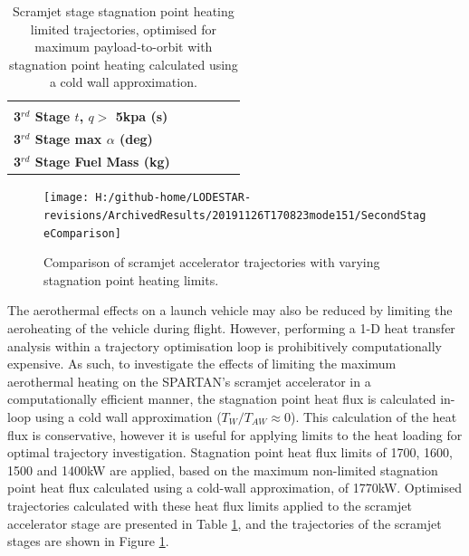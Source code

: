 \begin{table}[ht]
\begin{tabular}{l c c c c c }
		& \textbf{\thirddExergyEffheatLimStandard}
		& \textbf{\thirddExergyEffheatLimSeventeenHundred}
		& \textbf{\thirddExergyEffheatLimSixteenHundred}
		& \textbf{\thirddExergyEffheatLimFifteenHundred}
		& \textbf{\thirddExergyEffheatLimFourteenHundred}
		\\
		\textbf{3$^{rd}$ Stage $t$, $q >$ 5kpa (s)}
		& \thirdqOverFiveheatLimStandard
		& \thirdqOverFiveheatLimSeventeenHundred
		& \thirdqOverFiveheatLimSixteenHundred
		& \thirdqOverFiveheatLimFifteenHundred
		& \thirdqOverFiveheatLimFourteenHundred
		\\
		\textbf{3$^{rd}$ Stage max $\alpha$ (deg)}
		& \thirdmaxAoAheatLimStandard
		& \thirdmaxAoAheatLimSeventeenHundred
		& \thirdmaxAoAheatLimSixteenHundred
		& \thirdmaxAoAheatLimFifteenHundred
		& \thirdmaxAoAheatLimFourteenHundred
		\\
		\textbf{3$^{rd}$ Stage Fuel Mass (kg)}
		& \thirdmFuelheatLimStandard
		& \thirdmFuelheatLimSeventeenHundred
		& \thirdmFuelheatLimSixteenHundred
		& \thirdmFuelheatLimFifteenHundred
		& \thirdmFuelheatLimFourteenHundred
		\\
		\hline 
	\end{tabular} 
	\caption{Scramjet stage stagnation point heating limited trajectories, optimised for maximum payload-to-orbit with stagnation point heating calculated using a cold wall approximation. }
	\label{tab:stagLim}
\end{table}

\begin{figure}[!ht]
\centering
\texttt{[image: H:/github-home/LODESTAR-revisions/ArchivedResults/20191126T170823mode151/SecondStageComparison]}
\caption{Comparison of scramjet accelerator trajectories with varying stagnation point heating limits.}
\label{fig:SecondStageheatlimComparison}
\end{figure}


The aerothermal effects on a launch vehicle may also be reduced by limiting the aeroheating of the vehicle during flight. However, performing a 1-D heat transfer analysis within a trajectory optimisation loop is prohibitively computationally expensive. 
As such, to investigate the effects of limiting the maximum aerothermal heating on the SPARTAN's scramjet accelerator in a computationally efficient manner, the stagnation point heat flux is calculated in-loop using a cold wall approximation ($T_W/T_{AW} \approx 0$). This calculation of the heat flux is conservative, however it is useful for applying limits to the heat loading for optimal trajectory investigation. Stagnation point heat flux limits of 1700, 1600, 1500 and 1400kW are applied, based on the maximum non-limited stagnation point heat flux calculated using a cold-wall approximation, of 1770kW. Optimised trajectories calculated with these heat flux limits applied to the scramjet accelerator stage are presented in Table \ref{tab:stagLim}, and the trajectories of the scramjet stages are shown in Figure \ref{fig:SecondStageheatlimComparison}. 

